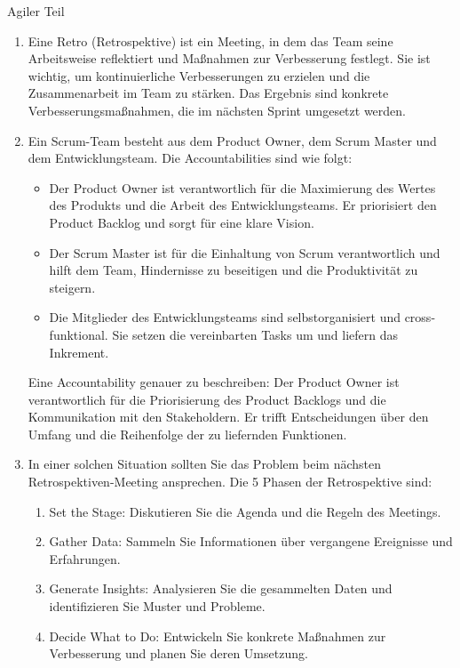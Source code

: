 \documentclass{article}
\begin{document}
\begin{exercise}{Agiler Teil}
  \begin{solution}
    \begin{enumerate}
      \item Eine Retro (Retrospektive) ist ein Meeting, in dem das Team seine Arbeitsweise reflektiert und Maßnahmen zur Verbesserung festlegt. Sie ist wichtig, um kontinuierliche Verbesserungen zu erzielen und die Zusammenarbeit im Team zu stärken. Das Ergebnis sind konkrete Verbesserungsmaßnahmen, die im nächsten Sprint umgesetzt werden.
      \item Ein Scrum-Team besteht aus dem Product Owner, dem Scrum Master und dem Entwicklungsteam. Die Accountabilities sind wie folgt:
            \begin{itemize}
              \item Der Product Owner ist verantwortlich für die Maximierung des Wertes des Produkts und die Arbeit des Entwicklungsteams. Er priorisiert den Product Backlog und sorgt für eine klare Vision.
              \item Der Scrum Master ist für die Einhaltung von Scrum verantwortlich und hilft dem Team, Hindernisse zu beseitigen und die Produktivität zu steigern.
              \item Die Mitglieder des Entwicklungsteams sind selbstorganisiert und cross-funktional. Sie setzen die vereinbarten Tasks um und liefern das Inkrement.
            \end{itemize}
            Eine Accountability genauer zu beschreiben: Der Product Owner ist verantwortlich für die Priorisierung des Product Backlogs und die Kommunikation mit den Stakeholdern. Er trifft Entscheidungen über den Umfang und die Reihenfolge der zu liefernden Funktionen.
      \item In einer solchen Situation sollten Sie das Problem beim nächsten Retrospektiven-Meeting ansprechen. Die 5 Phasen der Retrospektive sind:
            \begin{enumerate}
              \item Set the Stage: Diskutieren Sie die Agenda und die Regeln des Meetings.
              \item Gather Data: Sammeln Sie Informationen über vergangene Ereignisse und Erfahrungen.
              \item Generate Insights: Analysieren Sie die gesammelten Daten und identifizieren Sie Muster und Probleme.
              \item Decide What to Do: Entwickeln Sie konkrete Maßnahmen zur Verbesserung und planen Sie deren Umsetzung.

\end{enumerate}
\end{enumerate}
\end{solution}
\end{exercise}
\end{document}
